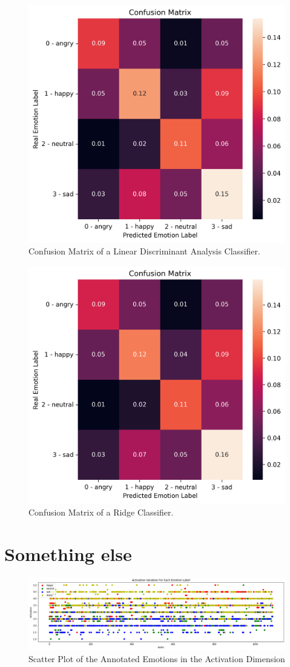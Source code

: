 \begin{figure}[H]
	\centering
	\includegraphics[width=.55\linewidth]{figs/appendix/feature_selection/LDACM.png}
	\caption{Confusion Matrix of a Linear Discriminant Analysis Classifier.}
\end{figure}

\begin{figure}[H]
	\centering
	\includegraphics[width=.55\linewidth]{figs/appendix/feature_selection/RidgeCM.png}
	\caption{Confusion Matrix of a Ridge Classifier.}
\end{figure}



\section{Something else}

\begin{figure}[H]
	\centering
	\includegraphics[width=1\linewidth]{figs/appendix/IEMOCAP_data_study/activationScatterAllEmotions.png}
	\caption{Scatter Plot of the Annotated Emotions in the Activation Dimension}
	\label{fig:activationScatter}
\end{figure}

